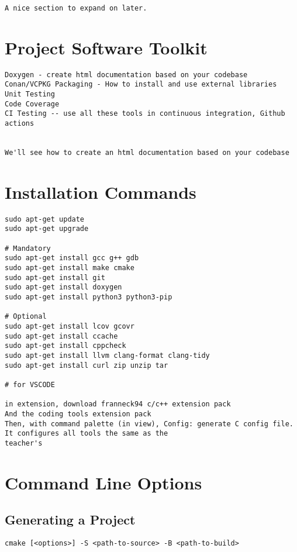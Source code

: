 \documentclass[openany]{report}
\begin{document}
\begin{verbatim}
A nice section to expand on later.
\end{verbatim}

\section{Project Software Toolkit}

\begin{verbatim}
Doxygen - create html documentation based on your codebase
Conan/VCPKG Packaging - How to install and use external libraries
Unit Testing
Code Coverage
CI Testing -- use all these tools in continuous integration, Github actions


We'll see how to create an html documentation based on your codebase
\end{verbatim}

\section{Installation Commands}

\begin{verbatim}
sudo apt-get update
sudo apt-get upgrade

# Mandatory
sudo apt-get install gcc g++ gdb
sudo apt-get install make cmake
sudo apt-get install git
sudo apt-get install doxygen
sudo apt-get install python3 python3-pip

# Optional
sudo apt-get install lcov gcovr
sudo apt-get install ccache
sudo apt-get install cppcheck
sudo apt-get install llvm clang-format clang-tidy
sudo apt-get install curl zip unzip tar

# for VSCODE

in extension, download franneck94 c/c++ extension pack
And the coding tools extension pack
Then, with command palette (in view), Config: generate C config file. It configures all tools the same as the
teacher's
\end{verbatim}

\section{Command Line Options}

\subsection{Generating a Project}

\begin{verbatim}
cmake [<options>] -S <path-to-source> -B <path-to-build>
\end{verbatim}
\end{document}
